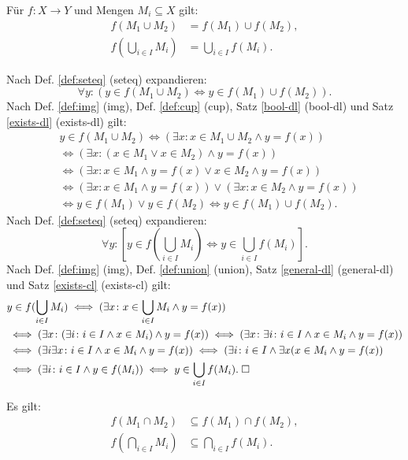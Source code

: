 \begin{Satz}
Für $f\colon X\to Y$ und Mengen $M_i\subseteq X$ gilt:
\begin{align}
f(M_1\cup M_2) &= f(M_1)\cup f(M_2),\\
f(\bigcup_{i\in I} M_i) &= \bigcup_{i\in I} f(M_i).
\end{align}
\end{Satz}
\begin{Beweis}
Nach Def. \ref{def:seteq} (seteq) expandieren:
\[\forall y\colon (y\in f(M_1\cup M_2)\iff y\in f(M_1)\cup f(M_2)).\]
Nach Def. \ref{def:img} (img), Def. \ref{def:cup} (cup),
Satz \ref{bool-dl} (bool-dl) und Satz \ref{exists-dl} (exists-dl) gilt:
\begin{align*}
&y\in f(M_1\cup M_2) \iff (\exists x\colon x\in M_1\cup M_2\land y=f(x))\\
&\iff (\exists x\colon (x\in M_1\lor x\in M_2)\land y=f(x))\\
&\iff (\exists x\colon x\in M_1\land y=f(x)\lor x\in M_2\land y=f(x))\\
&\iff (\exists x\colon x\in M_1\land y=f(x))\lor (\exists x\colon x\in M_2\land y=f(x))\\
&\iff y\in f(M_1)\lor y\in f(M_2) \iff y\in f(M_1)\cup f(M_2).
\end{align*}
Nach Def. \ref{def:seteq} (seteq) expandieren:
\[\forall y\colon [y\in f(\bigcup_{i\in I} M_i)\iff y\in \bigcup_{i\in I} f(M_i)].\]
Nach Def. \ref{def:img} (img), Def. \ref{def:union} (union),
Satz \ref{general-dl} (general-dl)\\
und Satz \ref{exists-cl} (exists-cl) gilt:
\begin{align*}
& y\in f(\bigcup_{i\in I} M_i)
\iff (\exists x\colon x\in\bigcup_{i\in I} M_i\land y=f(x))\\
&\iff (\exists x\colon (\exists i\colon i\in I\land x\in M_i)\land y=f(x))
\iff (\exists x\colon \exists i\colon i\in I\land x\in M_i\land y=f(x))\\
&\iff (\exists i\exists x\colon i\in I\land x\in M_i\land y=f(x))
\iff (\exists i\colon i\in I\land\exists x(x\in M_i\land y=f(x))\\
&\iff (\exists i\colon i\in I\land y\in f(M_i))
\iff y\in\bigcup_{i\in I} f(M_i).\;\square
\end{align*}
\end{Beweis}

\begin{Satz}\label{img-cap-semi-dl}
Es gilt:
\begin{align}
f(M_1\cap M_2) &\subseteq f(M_1)\cap f(M_2),\\
f(\bigcap_{i\in I} M_i) &\subseteq \bigcap_{i\in I} f(M_i).
\end{align}
\end{Satz}

